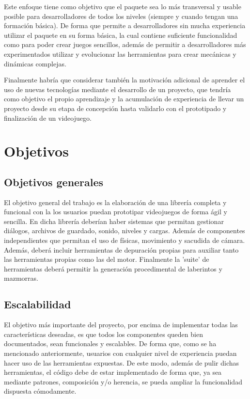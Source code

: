 Este enfoque tiene como objetivo que el paquete sea lo más transversal y usable posible para desarrolladores de todos los niveles (siempre y cuando tengan una formación básica).
 De forma que permite a desarrolladores sin mucha experiencia utilizar el paquete en su forma básica, la cual contiene suficiente funcionalidad como para poder crear juegos
 sencillos, además de permitir a desarrolladores más experimentados utilizar y evolucionar las herramientas para crear mecánicas y dinámicas complejas.
 
 Finalmente habría que considerar también la motivación adicional de aprender el uso de nuevas tecnologías mediante el desarrollo de un proyecto, que tendría como objetivo el
  propio aprendizaje y la acumulación de experiencia de llevar un proyecto desde su etapa de concepción hasta validarlo con el prototipado y finalización de un videojuego. 

\section{Objetivos}
\subsection{Objetivos generales}
El objetivo general del trabajo es la elaboración de una librería completa y funcional con la los usuarios puedan prototipar videojuegos de forma ágil y sencilla. 
 En dicha librería deberían haber sistemas que permitan gestionar diálogos, archivos de guardado, sonido, niveles y cargas. Además de componentes independientes que permitan 
 el uso de físicas, movimiento y sacudida de cámara. Además, deberá incluir herramientas de depuración propias para auxiliar tanto las herramientas propias como las del motor. 
 Finalmente la 'suite' de herramientas deberá permitir la generación procedimental de laberintos y mazmorras.

\subsection{Escalabilidad}
El objetivo más importante del proyecto, por encima de implementar todas las características deseadas, es que todos los componentes queden bien documentados, sean funcionales
 y escalables. De forma que, como se ha mencionado anteriormente, usuarios con cualquier nivel de experiencia puedan hacer uso de las herramientas expuestas. De este modo, 
 además de pulir dichas herramientas, el código debe de estar implementado de forma que, ya sea mediante patrones, composición y/o herencia, se pueda ampliar la funcionalidad dispuesta
 cómodamente.
 
